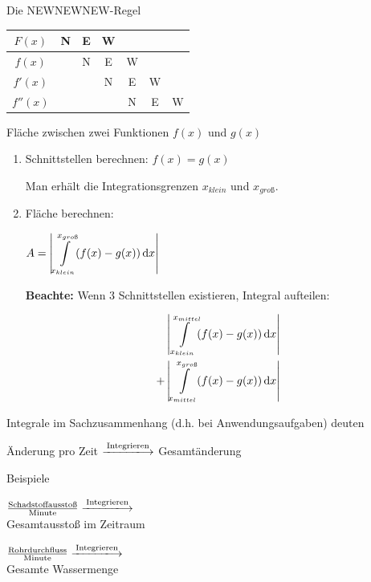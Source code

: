 \documentclass[paper=a6,landscape,ngerman,twoside=true,fontsize=12pt]{scrartcl}
\begin{document}
\begin{frage}
	Die NEWNEWNEW-Regel
\end{frage}
\begin{antwort}
\begin{center}
\begin{tabular}{c|c|c|c|c|c|c}
	$F(x)$      & N & E & W &   &   &   \\ \hline
	$f(x)$      &   & N & E & W &   &   \\ \hline
	$f'(x)$     &   &   & N & E & W &   \\ \hline
	$f''(x)$    &   &   &   & N & E & W
\end{tabular}
\end{center}
\end{antwort}

\begin{frage}
	Fläche zwischen zwei Funktionen $f(x)$ und $g(x)$
\end{frage}
\begin{antwort}
		\large
		\begin{enumerate} 
			\item Schnittstellen berechnen: $f(x)=g(x)$
			
			Man erhält die Integrationsgrenzen $x_{klein}$ und $x_{gro\text{ß}}$.
			\item Fläche berechnen: 
			
				$A=\left|\displaystyle\int\limits_{x_{klein}}^{x_{gro\text{ß}}} \! (f(x)-g(x)) \, \mathrm{d}x\right|$
			
			\textbf{Beachte:} \Large Wenn 3 Schnittstellen existieren, Integral aufteilen:
			
			\normalsize
			\begin{align*}
				&\left|\displaystyle\int\limits_{x_{klein}}^{x_{mittel}} \! (f(x)-g(x)) \, \mathrm{d}x\right|\\
				+&\left|\displaystyle\int\limits_{x_{mittel}}^{x_{gro\text{ß}}} \! (f(x)-g(x)) \, \mathrm{d}x\right|
			\end{align*}
		\end{enumerate} 
\end{antwort}
\begin{frage}
	Integrale im Sachzusammenhang (d.h. bei Anwendungsaufgaben) deuten
\end{frage}
\begin{antwort}
	Änderung pro Zeit $\xlongrightarrow{\text{Integrieren}}$ Gesamtänderung 
	
	\bigskip Beispiele
	
	\large\bigskip
	$\frac{\text{Schadstoffausstoß}}{\text{Minute}} \xlongrightarrow{\text{Integrieren}}$ \\ Gesamtausstoß im Zeitraum
	
	\vspace{0.5cm}
	
	$\frac{\text{Rohrdurchfluss}}{\text{Minute}} \xlongrightarrow{\text{Integrieren}}$ \\ Gesamte Wassermenge
\end{antwort}
\end{document}
